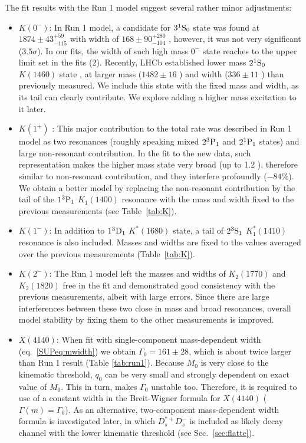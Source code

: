 The fit results with the Run 1 model suggest several rather minor adjustments:
\begin{itemize}
\item $K(0^-)$: 
In Run 1 model, a candidate for $3{}^{1}{\rm S}_{0}$ state was found at $1874\pm 43^{+59}_{-115}$ \mev with width of $168\pm 90^{+280}_{-104}$ \mev, 
however, it was not very significant ($3.5\sigma$). 
In our fits, the width of such high mass $0^-$ state reaches to the upper limit set in the fits (2\gev). 
Recently, LHCb established lower mass $2{}^{1}{\rm S}_{0}$ $K(1460)$ state \supercite{LHCb-PAPER-2017-040}, 
at larger mass ($1482\pm16$ \mev) and width ($336\pm11$ \mev) than previously measured. 
We include this state with the fixed mass and width, as its tail can clearly contribute. 
We explore adding a higher mass excitation to it later.   
\item $K(1^+)$ : 
This major contribution to the total rate was described in Run 1 model as two resonances (roughly speaking mixed $2{}^{3}{\rm P}_{1}$ and $2{}^{1}{\rm P}_{1}$ states) and large non-resonant contribution. 
In the fit to the new data, such representation makes the higher mass state very broad (up to 1.2 \gev), 
therefore similar to non-resonant contribution, and they interfere profoundly ($-84\%$).
We obtain a better model by replacing the non-resonant contribution by the tail of the $1{}^{3}{\rm P}_{1}$ $K_1(1400)$ 
resonance with the mass and width fixed to the previous measurements (see Table~\ref{tab:K}).
\item $K(1^-)$: 
In addition to $1{}^{3}{\rm D}_{1}$ $K^*(1680)$ state, 
a tail of $2{}^{3}{\rm S}_{1}$ $K^*_1(1410)$ resonance is also included. 
Masses and widths are fixed to the values averaged over the previous measurements (Table~\ref{tab:K}).
\item $K(2^-)$: The Run 1 model left the masses and widths of $K_2(1770)$ and $K_2(1820)$ free in the fit and demonstrated good consistency with the previous measurements, 
albeit with large errors. 
Since there are large interferences between these two close in mass and broad resonances, 
overall model stability by fixing them to the other measurements is improved. 
\item $X(4140)$: When fit with single-component mass-dependent width (eq.~\ref{SUPeq:mwidth}) we obtain $\Gamma_0=161\pm28$\mev, 
which is about twice larger than Run 1 result (Table \ref{tab:run1}).
Because $M_0$ is very close to the kinematic threshold, 
$q_0$ can be very small and strongly dependent on exact value of $M_0$.
This in turn, makes $\Gamma_0$ unstable too. 
Therefore, 
it is required to use of a constant width in the Breit-Wigner formula for $X(4140)$ ($\Gamma(m)=\Gamma_0$).
As an alternative, 
two-component mass-dependent width formula is investigated later, 
in which $D_s^{*+}D_s^-$ is included as likely decay channel with the lower kinematic threshold (see Sec.~\ref{sec:flatte}).  
\end{itemize}

